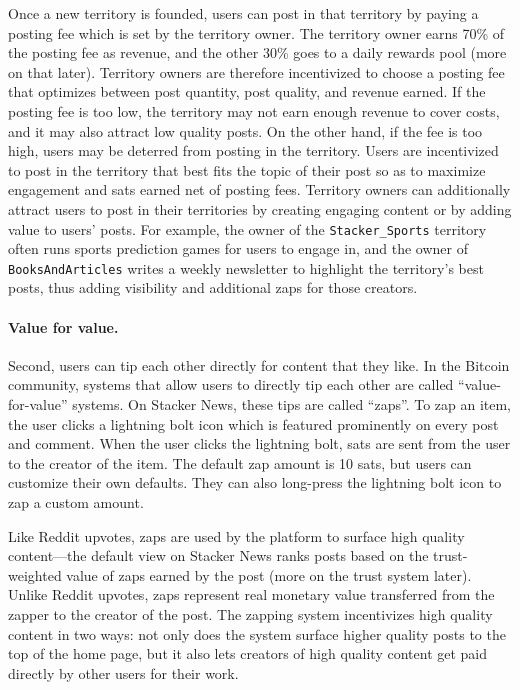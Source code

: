 Once a new territory is founded, users can post in that territory by paying a posting fee which is set by the territory owner. The territory owner earns 70\% of the posting fee as revenue, and the other 30\% goes to a daily rewards pool (more on that later). Territory owners are therefore incentivized to choose a posting fee that optimizes between post quantity, post quality, and revenue earned. If the posting fee is too low, the territory may not earn enough revenue to cover costs, and it may also attract low quality posts. On the other hand, if the fee is too high, users may be deterred from posting in the territory. Users are incentivized to post in the territory that best fits the topic of their post so as to maximize engagement and sats earned net of posting fees. Territory owners can additionally attract users to post in their territories by creating engaging content or by adding value to users' posts. For example, the owner of the  \texttt{Stacker\_Sports} territory often runs sports prediction games for users to engage in, and the owner of \texttt{BooksAndArticles} writes a weekly newsletter to highlight the territory's best posts, thus adding visibility and additional zaps for those creators.

\paragraph{Value for value.} Second, users can tip each other directly for content that they like. In the Bitcoin community, systems that allow users to directly tip each other are called ``value-for-value'' systems. On Stacker News, these tips are called ``zaps''. To zap an item, the user clicks a lightning bolt icon which is featured prominently on every post and comment. When the user clicks the lightning bolt, sats are sent from the user to the creator of the item. The default zap amount is 10 sats, but users can customize their own defaults. They can also long-press the lightning bolt icon to zap a custom amount.

Like Reddit upvotes, zaps are used by the platform to surface high quality content---the default view on Stacker News ranks posts based on the trust-weighted value of zaps earned by the post (more on the trust system later). Unlike Reddit upvotes, zaps represent real monetary value transferred from the zapper to the creator of the post. The zapping system incentivizes high quality content in two ways: not only does the system surface higher quality posts to the top of the home page, but it also lets creators of high quality content get paid directly by other users for their work.

